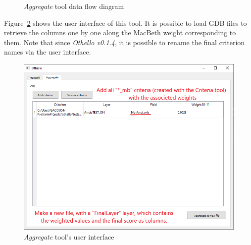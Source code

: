 \documentclass[11pt]{article}
\begin{document}
\begin{figure}[H]
    \centering
    
    \caption{\textit{Aggregate} tool data flow diagram}
    \label{fig:aggregate-tool}
\end{figure}

Figure\ \ref{fig:aggregate-ui} shows the user interface of this tool.
It is possible to load GDB files to retrieve the columns one
by one along the MacBeth weight corresponding to them.
Note that since \textit{Othello v0.1.4}, it is possible to rename the
final criterion names via the user interface.

\begin{figure}[H]
    \centering
    \includegraphics[width=.8\linewidth]{../images/aggregate_tool.png}
    \caption{\textit{Aggregate} tool's user interface}
\label{fig:aggregate-ui}

\end{figure}
\end{document}
